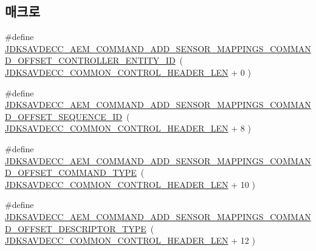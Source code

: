 \subsection*{매크로}
\begin{DoxyCompactItemize}
\item 
\#define \hyperlink{group__command__add__sensor__mappings_ga82aadc30a2138461a6cc36408f20c06b}{J\+D\+K\+S\+A\+V\+D\+E\+C\+C\+\_\+\+A\+E\+M\+\_\+\+C\+O\+M\+M\+A\+N\+D\+\_\+\+A\+D\+D\+\_\+\+S\+E\+N\+S\+O\+R\+\_\+\+M\+A\+P\+P\+I\+N\+G\+S\+\_\+\+C\+O\+M\+M\+A\+N\+D\+\_\+\+O\+F\+F\+S\+E\+T\+\_\+\+C\+O\+N\+T\+R\+O\+L\+L\+E\+R\+\_\+\+E\+N\+T\+I\+T\+Y\+\_\+\+ID}~( \hyperlink{group__jdksavdecc__avtp__common__control__header_gaae84052886fb1bb42f3bc5f85b741dff}{J\+D\+K\+S\+A\+V\+D\+E\+C\+C\+\_\+\+C\+O\+M\+M\+O\+N\+\_\+\+C\+O\+N\+T\+R\+O\+L\+\_\+\+H\+E\+A\+D\+E\+R\+\_\+\+L\+EN} + 0 )
\item 
\#define \hyperlink{group__command__add__sensor__mappings_ga1b19cd5e3c8a9441ade90d77e6c9b6fc}{J\+D\+K\+S\+A\+V\+D\+E\+C\+C\+\_\+\+A\+E\+M\+\_\+\+C\+O\+M\+M\+A\+N\+D\+\_\+\+A\+D\+D\+\_\+\+S\+E\+N\+S\+O\+R\+\_\+\+M\+A\+P\+P\+I\+N\+G\+S\+\_\+\+C\+O\+M\+M\+A\+N\+D\+\_\+\+O\+F\+F\+S\+E\+T\+\_\+\+S\+E\+Q\+U\+E\+N\+C\+E\+\_\+\+ID}~( \hyperlink{group__jdksavdecc__avtp__common__control__header_gaae84052886fb1bb42f3bc5f85b741dff}{J\+D\+K\+S\+A\+V\+D\+E\+C\+C\+\_\+\+C\+O\+M\+M\+O\+N\+\_\+\+C\+O\+N\+T\+R\+O\+L\+\_\+\+H\+E\+A\+D\+E\+R\+\_\+\+L\+EN} + 8 )
\item 
\#define \hyperlink{group__command__add__sensor__mappings_gaa86eb8c343b8413f5fc358ad371a5aec}{J\+D\+K\+S\+A\+V\+D\+E\+C\+C\+\_\+\+A\+E\+M\+\_\+\+C\+O\+M\+M\+A\+N\+D\+\_\+\+A\+D\+D\+\_\+\+S\+E\+N\+S\+O\+R\+\_\+\+M\+A\+P\+P\+I\+N\+G\+S\+\_\+\+C\+O\+M\+M\+A\+N\+D\+\_\+\+O\+F\+F\+S\+E\+T\+\_\+\+C\+O\+M\+M\+A\+N\+D\+\_\+\+T\+Y\+PE}~( \hyperlink{group__jdksavdecc__avtp__common__control__header_gaae84052886fb1bb42f3bc5f85b741dff}{J\+D\+K\+S\+A\+V\+D\+E\+C\+C\+\_\+\+C\+O\+M\+M\+O\+N\+\_\+\+C\+O\+N\+T\+R\+O\+L\+\_\+\+H\+E\+A\+D\+E\+R\+\_\+\+L\+EN} + 10 )
\item 
\#define \hyperlink{group__command__add__sensor__mappings_ga14bc603f9eb0a6055b75c102bdfadd3d}{J\+D\+K\+S\+A\+V\+D\+E\+C\+C\+\_\+\+A\+E\+M\+\_\+\+C\+O\+M\+M\+A\+N\+D\+\_\+\+A\+D\+D\+\_\+\+S\+E\+N\+S\+O\+R\+\_\+\+M\+A\+P\+P\+I\+N\+G\+S\+\_\+\+C\+O\+M\+M\+A\+N\+D\+\_\+\+O\+F\+F\+S\+E\+T\+\_\+\+D\+E\+S\+C\+R\+I\+P\+T\+O\+R\+\_\+\+T\+Y\+PE}~( \hyperlink{group__jdksavdecc__avtp__common__control__header_gaae84052886fb1bb42f3bc5f85b741dff}{J\+D\+K\+S\+A\+V\+D\+E\+C\+C\+\_\+\+C\+O\+M\+M\+O\+N\+\_\+\+C\+O\+N\+T\+R\+O\+L\+\_\+\+H\+E\+A\+D\+E\+R\+\_\+\+L\+EN} + 12 )

\end{DoxyCompactItemize}

